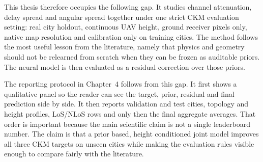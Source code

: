 This thesis therefore occupies the following gap. It studies channel
attenuation, delay spread and angular spread together under one strict CKM
evaluation setting: real city holdout, continuous UAV height, ground receiver pixels only,
native map resolution and calibration only on training cities. The method
follows the most useful lesson from the literature, namely that physics and geometry should
not be relearned from scratch when they can be frozen as auditable priors. The
neural model is then evaluated as a residual correction over those priors.

The reporting protocol in Chapter~4 follows from this gap. It first shows a
qualitative panel so the reader can see the target, prior, residual and final
prediction side by side. It then reports validation and test cities, topology
and height profiles, LoS/NLoS rows and only then the final aggregate averages.
That order is important because the main scientific claim is not a single
leaderboard number. The claim is that a prior based, height conditioned joint
model improves all three CKM targets on unseen cities while making the
evaluation rules visible enough to compare fairly with the literature.
